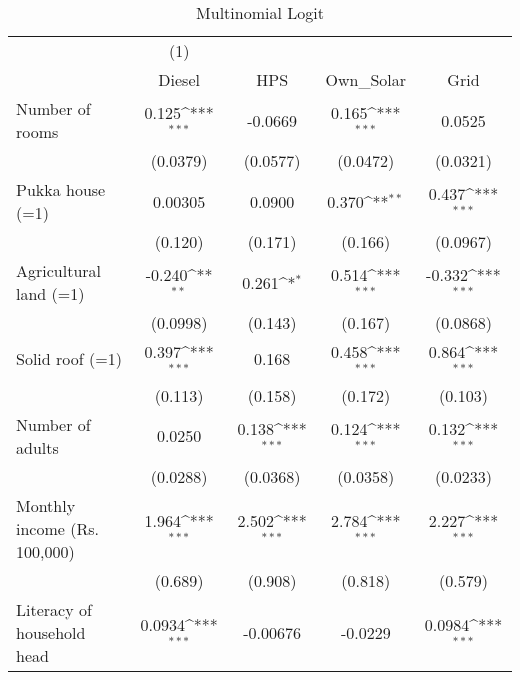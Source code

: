\begin{table}[htbp]\centering
\def\sym#1{\ifmmode^{#1}\else\(^{#1}\)\fi}
\caption{Multinomial Logit}
\begin{tabular}{l*{4}{c}}
\toprule
                    &\multicolumn{1}{c}{(1)}         &                     &                     &                     \\
                    &      Diesel         &         HPS         &   Own\_Solar         &        Grid         \\
\midrule
Number of rooms     &       0.125\sym{***}&     -0.0669         &       0.165\sym{***}&      0.0525         \\
                    &    (0.0379)         &    (0.0577)         &    (0.0472)         &    (0.0321)         \\
\addlinespace
Pukka house (=1)    &     0.00305         &      0.0900         &       0.370\sym{**} &       0.437\sym{***}\\
                    &     (0.120)         &     (0.171)         &     (0.166)         &    (0.0967)         \\
\addlinespace
Agricultural land (=1)&      -0.240\sym{**} &       0.261\sym{*}  &       0.514\sym{***}&      -0.332\sym{***}\\
                    &    (0.0998)         &     (0.143)         &     (0.167)         &    (0.0868)         \\
\addlinespace
Solid roof (=1)     &       0.397\sym{***}&       0.168         &       0.458\sym{***}&       0.864\sym{***}\\
                    &     (0.113)         &     (0.158)         &     (0.172)         &     (0.103)         \\
\addlinespace
Number of adults    &      0.0250         &       0.138\sym{***}&       0.124\sym{***}&       0.132\sym{***}\\
                    &    (0.0288)         &    (0.0368)         &    (0.0358)         &    (0.0233)         \\
\addlinespace
Monthly income (Rs. 100,000)&       1.964\sym{***}&       2.502\sym{***}&       2.784\sym{***}&       2.227\sym{***}\\
                    &     (0.689)         &     (0.908)         &     (0.818)         &     (0.579)         \\
\addlinespace
Literacy of household head&      0.0934\sym{***}&    -0.00676         &     -0.0229         &      0.0984\sym{***}\\

\end{tabular}
\end{table}
